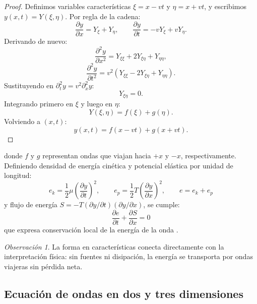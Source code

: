 \documentclass[12pt, a4paper]{article}
\theoremstyle{plain}
\theoremstyle{definition}
\theoremstyle{remark}
\newtheorem*{observacion}{Observación}
\begin{document}
\begin{proof}
Definimos variables características
$\xi=x-vt$ y $\eta=x+vt$, y escribimos $y(x,t)=Y(\xi,\eta)$.
Por regla de la cadena:
\begin{equation}
  \frac{\partial y}{\partial x}=Y_\xi+Y_\eta,\qquad
  \frac{\partial y}{\partial t}=-vY_\xi+vY_\eta.
\end{equation}
Derivando de nuevo:
\begin{equation}
  \frac{\partial^2 y}{\partial x^2}=Y_{\xi\xi}+2Y_{\xi\eta}+Y_{\eta\eta},
\end{equation}
\begin{equation}
  \frac{\partial^2 y}{\partial t^2}
  =v^2\!\left(Y_{\xi\xi}-2Y_{\xi\eta}+Y_{\eta\eta}\right).
\end{equation}
Sustituyendo en $\partial_t^2 y=v^2\partial_x^2 y$:
\begin{equation}
  Y_{\xi\eta}=0.
\end{equation}
Integrando primero en $\xi$ y luego en $\eta$:
\begin{equation}
  Y(\xi,\eta)=f(\xi)+g(\eta).
\end{equation}
Volviendo a $(x,t)$:
\begin{equation}
  y(x,t)=f(x-vt)+g(x+vt).
\end{equation}
\end{proof}
donde $f$ y $g$ representan ondas que viajan hacia $+x$ y $-x$, respectivamente.
Definiendo densidad de energía cinética y potencial elástica por unidad de longitud:
\begin{equation}
  e_k=\frac{1}{2}\mu\left(\frac{\partial y}{\partial t}\right)^2,\qquad
  e_p=\frac{1}{2}T\left(\frac{\partial y}{\partial x}\right)^2,\qquad
  e=e_k+e_p
\end{equation}
y flujo de energía $S=-T(\partial y/\partial t)(\partial y/\partial x)$, se cumple:
\begin{equation}
  \frac{\partial e}{\partial t}+\frac{\partial S}{\partial x}=0
\end{equation}
que expresa conservación local de la energía de la onda \cite{mit803_ch6}.
\begin{observacion}
La forma en características conecta directamente con la interpretación física: sin fuentes ni
disipación, la energía se transporta por ondas viajeras sin pérdida neta.
\end{observacion}

\subsection{Ecuación de ondas en dos y tres dimensiones}
\end{document}
